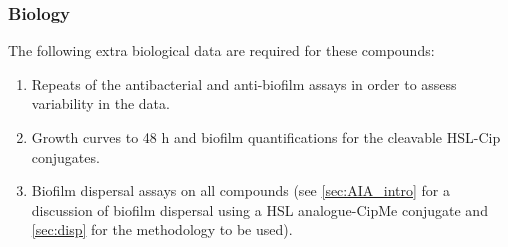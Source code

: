 \subsubsection{Biology}

The following extra biological data are required for these compounds:

\begin{enumerate}

\item Repeats of the antibacterial and anti-biofilm assays in order to assess variability in the data.

\item Growth curves to 48 h and biofilm quantifications for the cleavable HSL-Cip conjugates.

\item Biofilm dispersal assays on all compounds (see \ref{sec:AIA_intro} for a discussion of biofilm dispersal using a HSL analogue-CipMe conjugate and \ref{sec:disp} for the methodology to be used).

\end{enumerate}